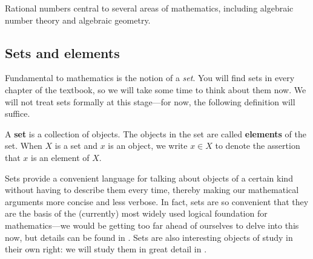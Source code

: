 Rational numbers central to several areas of mathematics, including algebraic number theory and algebraic geometry.

%
%
%
%
%

\subsection*{Sets and elements}

Fundamental to mathematics is the notion of a \textit{set}. You will find sets in every chapter of the textbook, so we will take some time to think about them now. We will not treat sets formally at this stage---for now, the following definition will suffice.

\begin{definition}
\label{defSetsPreliminary}
A \textbf{set} is a collection of objects. The objects in the set are called \textbf{elements} of the set. When $X$ is a set and $x$ is an object, we write $x \in X$  to denote the assertion that $x$ is an element of $X$.
\end{definition}

Sets provide a convenient language for talking about objects of a certain kind without having to describe them every time, thereby making our mathematical arguments more concise and less verbose. In fact, sets are so convenient that they are the basis of the (currently) most widely used logical foundation for mathematics---we would be getting too far ahead of ourselves to delve into this now, but details can be found in . Sets are also interesting objects of study in their own right: we will study them in great detail in .

